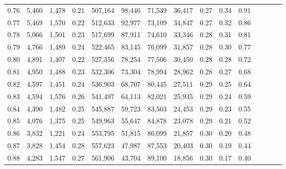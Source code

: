\begin{tabular}{rrrcrrrrrrrrrrr}
0.76 &   5,460 &  1,478 &                                       0.21 &  507,164 &   98,446 &   71,539 &   36,417 &  0.27 &  0.34 &                         0.91 \\
0.77 &   5,469 &  1,570 &                                       0.22 &  512,633 &   92,977 &   73,109 &   34,847 &  0.27 &  0.32 &                         0.86 \\
0.78 &   5,066 &  1,501 &                                       0.23 &  517,699 &   87,911 &   74,610 &   33,346 &  0.28 &  0.31 &                         0.81 \\
0.79 &   4,766 &  1,489 &                                       0.24 &  522,465 &   83,145 &   76,099 &   31,857 &  0.28 &  0.30 &                         0.77 \\
0.80 &   4,891 &  1,407 &                                       0.22 &  527,356 &   78,254 &   77,506 &   30,450 &  0.28 &  0.28 &                         0.72 \\
0.81 &   4,950 &  1,488 &                                       0.23 &  532,306 &   73,304 &   78,994 &   28,962 &  0.28 &  0.27 &                         0.68 \\
0.82 &   4,597 &  1,451 &                                       0.24 &  536,903 &   68,707 &   80,445 &   27,511 &  0.29 &  0.25 &                         0.64 \\
0.83 &   4,594 &  1,576 &                                       0.26 &  541,497 &   64,113 &   82,021 &   25,935 &  0.29 &  0.24 &                         0.59 \\
0.84 &   4,390 &  1,482 &                                       0.25 &  545,887 &   59,723 &   83,503 &   24,453 &  0.29 &  0.23 &                         0.55 \\
0.85 &   4,076 &  1,375 &                                       0.25 &  549,963 &   55,647 &   84,878 &   23,078 &  0.29 &  0.21 &                         0.52 \\
0.86 &   3,832 &  1,221 &                                       0.24 &  553,795 &   51,815 &   86,099 &   21,857 &  0.30 &  0.20 &                         0.48 \\
0.87 &   3,828 &  1,454 &                                       0.28 &  557,623 &   47,987 &   87,553 &   20,403 &  0.30 &  0.19 &                         0.44 \\
0.88 &   4,283 &  1,547 &                                       0.27 &  561,906 &   43,704 &   89,100 &   18,856 &  0.30 &  0.17 &                         0.40 \\

\end{tabular}
